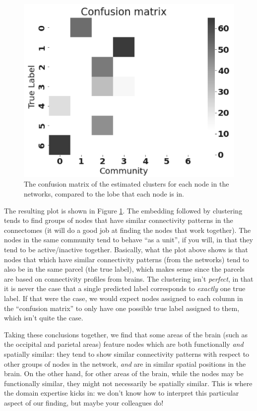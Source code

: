 \begin{figure}[h]
    \centering
    \includegraphics[width=0.5\linewidth]{foundations/ch2/Images/cf_mtx.png}
    \caption[Confusion matrix for node predictions]{The confusion matrix of the estimated clusters for each node in the networks, compared to the lobe that each node is in.}
    \label{fig:ch2:cf_mtx}
\end{figure}
The resulting plot is shown in Figure \ref{fig:ch2:cf_mtx}. The  embedding followed by clustering tends to find groups of nodes that have similar connectivity patterns in the connectomes (it will do a good job at finding the nodes that work together). The nodes in the same community tend to behave ``as a unit'', if you will, in that they tend to be active/inactive together. Basically, what the plot above shows is that nodes that which have similar connectivity patterns (from the networks) tend to also be in the same parcel (the true label), which makes sense since the parcels are based on connectivity profiles from brains. The clustering isn't \emph{perfect}, in that it is never the case that a single predicted label corresponds to \emph{exactly} one true label. If that were the case, we would expect nodes assigned to each column in the ``confusion matrix'' to only have one possible true label assigned to them, which isn't quite the case. 

Taking these conclusions together, we find that some areas of the brain (such as the occipital and parietal areas) feature nodes which are both functionally \emph{and} spatially similar: they tend to show similar connectivity patterns with respect to other groups of nodes in the network, \emph{and} are in similar spatial positions in the brain. On the other hand, for other areas of the brain, while the nodes may be functionally similar, they might not necessarily be spatially similar. This is where the domain expertise kicks in: we don't know how to interpret this particular aspect of our finding, but maybe your colleagues do!

